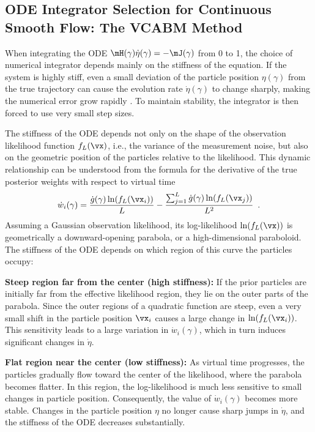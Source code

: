 \subsection{ODE Integrator Selection for Continuous Smooth Flow: The VCABM Method}
\label{subsec:vcabm}

When integrating the ODE $\mH(\gamma)\dot{\eta}(\gamma) = -\mJ(\gamma)$ from 0 to 1, the choice of numerical integrator depends mainly on the stiffness of the equation. If the system is highly stiff, even a small deviation of the particle position $\eta(\gamma)$ from the true trajectory can cause the evolution rate $\dot{\eta}(\gamma)$ to change sharply, making the numerical error grow rapidly \cite{NME}. To maintain stability, the integrator is then forced to use very small step sizes.

The stiffness of the ODE depends not only on the shape of the observation likelihood function $f_L(\vx)$, i.e., the variance of the measurement noise, but also on the geometric position of the particles relative to the likelihood. This dynamic relationship can be understood from the formula for the derivative of the true posterior weights with respect to virtual time
$$\dot{w}_i(\gamma)=\frac{\dot g(\gamma)\ln(f_L(\vx_i))}{L}-\frac{\sum_{j=1}^L \dot g(\gamma)\ln(f_L(\vx_j))}{L^2}\enspace.$$
Assuming a Gaussian observation likelihood, its log-likelihood $\ln(f_L(\vx))$ is geometrically a downward-opening parabola, or a high-dimensional paraboloid. The stiffness of the ODE depends on which region of this curve the particles occupy:

\textbf{Steep region far from the center (high stiffness):} If the prior particles are initially far from the effective likelihood region, they lie on the outer parts of the parabola. Since the outer regions of a quadratic function are steep, even a very small shift in the particle position $\vx_i$ causes a large change in $\ln(f_L(\vx_i))$. This sensitivity leads to a large variation in $\dot{w}_i(\gamma)$, which in turn induces significant changes in $\dot{\eta}$.

\textbf{Flat region near the center (low stiffness):} As virtual time progresses, the particles gradually flow toward the center of the likelihood, where the parabola becomes flatter. In this region, the log-likelihood is much less sensitive to small changes in particle position. Consequently, the value of $\dot{w}_i(\gamma)$ becomes more stable. Changes in the particle position $\eta$ no longer cause sharp jumps in $\dot{\eta}$, and the stiffness of the ODE decreases substantially.

